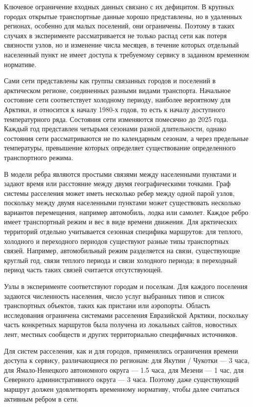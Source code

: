 Ключевое ограничение входных данных связано с их дефицитом. В крупных городах открытые транспортные данные хорошо представлены, но в удаленных регионах, особенно для малых поселений, они ограничены. Поэтому в таких случаях в эксперименте рассматривается не только распад сети как потеря связности узлов, но и изменение числа месяцев, в течение которых отдельный населенный пункт не имеет доступа к требуемому сервису в заданном временном нормативе.

Сами сети представлены как группы связанных городов и поселений в арктическом регионе, соединенных разными видами транспорта. Начальное состояние сети соответствует холодному периоду, наиболее вероятному для Арктики, и относится к началу 1980-х годов, то есть к началу доступного температурного ряда. Состояния сети изменяются помесячно до 2025 года. Каждый год представлен четырьмя сезонами разной длительности, однако состояния сети рассматриваются не по календарным сезонам, а через предельные температуры, превышение которых определяет существование определенного транспортного режима.

В модели ребра являются простыми связями между населенными пунктами и задают время или расстояние между двумя географическими точками. Граф системы расселения может иметь несколько ребер между одной парой узлов, поскольку между двумя населенными пунктами может существовать несколько вариантов перемещения, например автомобиль, лодка или самолет. Каждое ребро имеет транспортный режим и вес в виде времени движения. Для арктических территорий отдельно учитывается сезонная специфика маршрутов: для теплого, холодного и переходного периодов существуют разные типы транспортных связей. Например, автомобильный режим разделяется на связи, существующие круглый год, связи теплого периода и связи холодного периода; в переходный период часть таких связей считается отсутствующей.

Узлы в эксперименте соответствуют городам и поселкам. Для каждого поселения задаются численность населения, число услуг выбранных типов и список транспортных объектов, таких как пристани или аэропорты. Область исследования ограничена системами расселения Евразийской Арктики, поскольку часть конкретных маршрутов была получена из локальных сайтов, новостных лент, местных сообществ и других территориально специфичных источников.

Для систем расселения, как и для городов, применялись ограничения времени доступа к сервису, различающиеся по регионам: для Якутии / Чукотки --- 3 часа, для Ямало-Ненецкого автономного округа --- 1.5 часа, для Мезени --- 1 час, для Северного административного округа --- 3 часа. Поэтому даже существующий маршрут должен удовлетворять временному нормативу, чтобы далее считаться активным ребром в сети.

